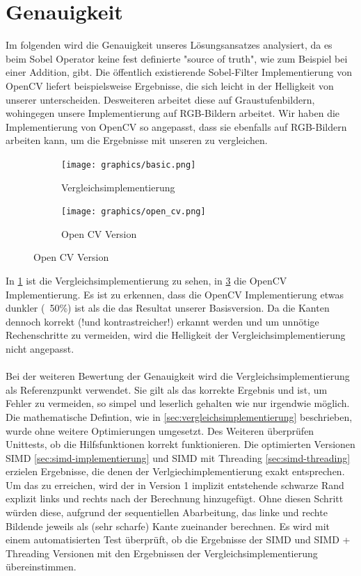 \documentclass[course=erap]{aspdoc}
\begin{document}
\section{Genauigkeit}
Im folgenden wird die Genauigkeit unseres Lösungsansatzes analysiert, da es beim Sobel Operator keine fest definierte "source of truth", wie zum Beispiel bei einer Addition, gibt.
Die öffentlich existierende Sobel-Filter Implementierung von OpenCV liefert beispielsweise Ergebnisse, die sich leicht in der Helligkeit von unserer unterscheiden.
Desweiteren arbeitet diese auf Graustufenbildern, wohingegen unsere Implementierung auf RGB-Bildern arbeitet.
Wir haben die Implementierung von OpenCV so angepasst, dass sie ebenfalls auf RGB-Bildern arbeiten kann, um die Ergebnisse mit unseren zu vergleichen.
\begin{figure}[H]
    \begin{subfigure}{.5\columnwidth}
        \centering
        \texttt{[image: graphics/basic.png]}
        \caption{Vergleichsimplementierung}
        \label{fig:basic}
    \end{subfigure}
    \begin{subfigure}{.5\columnwidth}
        \centering
        \texttt{[image: graphics/open\_cv.png]}
        \caption{Open CV Version}
        \label{fig:opencv}
    \end{subfigure}
\end{figure}
In \ref{fig:basic} ist die Vergleichsimplementierung zu sehen, in \ref{fig:opencv} die OpenCV Implementierung.
Es ist zu erkennen, dass die OpenCV Implementierung etwas dunkler (~50\%) ist als die das Resultat unserer Basisversion.
Da die Kanten dennoch korrekt (!und kontrastreicher!) erkannt werden und um unnötige Rechenschritte zu vermeiden, wird die Helligkeit der Vergleichsimplementierung nicht angepasst.
\\\\
Bei der weiteren Bewertung der Genauigkeit wird die Vergleichsimplementierung als Referenzpunkt verwendet.
Sie gilt als das korrekte Ergebnis und ist, um Fehler zu vermeiden, so simpel und leserlich gehalten wie nur irgendwie möglich.
Die mathematische Defintion, wie in \ref{sec:vergleichsimplementierung} beschrieben, wurde ohne weitere Optimierungen umgesetzt.
Des Weiteren überprüfen Unittests, ob die Hilfsfunktionen korrekt funktionieren.
Die optimierten Versionen SIMD \ref{sec:simd-implementierung} und SIMD mit Threading \ref{sec:simd-threading} erzielen Ergebnisse, die denen der Verlgiechimplementierung exakt entsprechen.
Um das zu erreichen, wird der in Version 1 implizit entstehende schwarze Rand explizit links und rechts nach der Berechnung hinzugefügt.
Ohne diesen Schritt würden diese, aufgrund der sequentiellen Abarbeitung, das linke und rechte Bildende jeweils als (sehr scharfe) Kante zueinander berechnen.
Es wird mit einem automatisierten Test überprüft, ob die Ergebnisse der SIMD und SIMD + Threading Versionen mit den Ergebnissen der Vergleichsimplementierung übereinstimmen.
\end{document}
